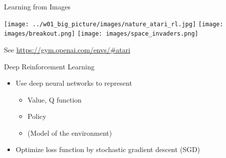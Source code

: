\documentclass[aspectratio=169]{../latex_main/tntbeamer}  %
\begin{document}
\begin{frame}[c]{Learning from Images}
	
\centering
\texttt{[image: ../w01\_big\_picture/images/nature\_atari\_rl.jpg]}
\texttt{[image: images/breakout.png]}
\texttt{[image: images/space\_invaders.png]}

\begin{flushright}
See \url{https://gym.openai.com/envs/\#atari}	
\end{flushright}

	
\end{frame}
\begin{frame}[c]{Deep Reinforcement Learning}

	\begin{itemize}
		\item Use deep neural networks to represent
		\begin{itemize}
			\item Value, Q function
			\item Policy
			\item (Model of the environment)
		\end{itemize}
		\item Optimize loss function by stochastic gradient descent (SGD)
	\end{itemize}
	
\end{frame}

\end{document}
